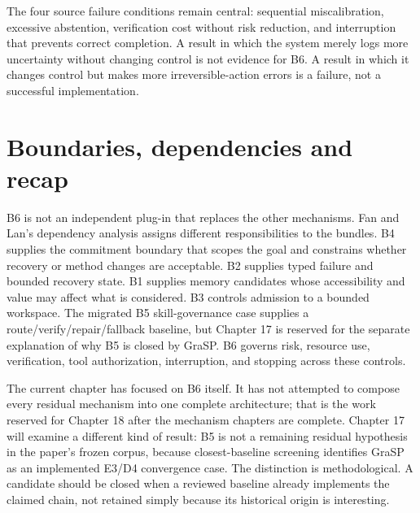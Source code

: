 The four source failure conditions remain central: sequential miscalibration, excessive abstention, verification cost without risk reduction, and interruption that prevents correct completion. A result in which the system merely logs more uncertainty without changing control is not evidence for B6. A result in which it changes control but makes more irreversible-action errors is a failure, not a successful implementation.

\section{Boundaries, dependencies and recap}
\label{sec:ch16-boundaries-recap}

B6 is not an independent plug-in that replaces the other mechanisms. Fan and Lan's dependency analysis assigns different responsibilities to the bundles. B4 supplies the commitment boundary that scopes the goal and constrains whether recovery or method changes are acceptable. B2 supplies typed failure and bounded recovery state. B1 supplies memory candidates whose accessibility and value may affect what is considered. B3 controls admission to a bounded workspace. The migrated B5 skill-governance case supplies a route/verify/repair/fallback baseline, but Chapter 17 is reserved for the separate explanation of why B5 is closed by GraSP. B6 governs risk, resource use, verification, tool authorization, interruption, and stopping across these controls.

The current chapter has focused on B6 itself. It has not attempted to compose every residual mechanism into one complete architecture; that is the work reserved for Chapter 18 after the mechanism chapters are complete. Chapter 17 will examine a different kind of result: B5 is not a remaining residual hypothesis in the paper's frozen corpus, because closest-baseline screening identifies GraSP as an implemented E3/D4 convergence case. The distinction is methodological. A candidate should be closed when a reviewed baseline already implements the claimed chain, not retained simply because its historical origin is interesting.

